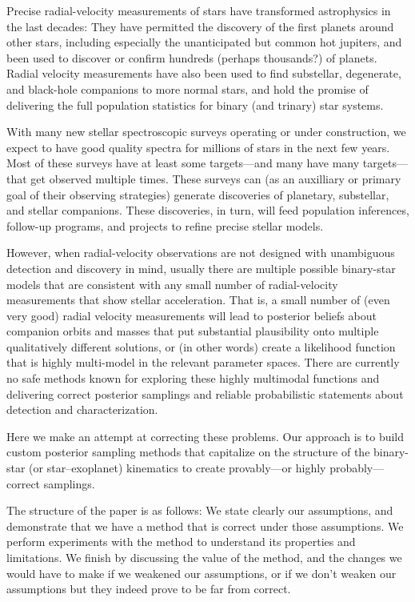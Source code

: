 \documentclass[12pt, preprint]{aastex}
\begin{document}
Precise radial-velocity measurements of stars have transformed
astrophysics in the last decades:
They have permitted the discovery of the first planets around other stars,
including especially the unanticipated but common hot jupiters,
and been used to discover or confirm hundreds
(perhaps thousands?) of planets.
Radial velocity measurements have also been used to find substellar,
degenerate, and black-hole companions to more normal stars, and hold
the promise of delivering the full population statistics for binary
(and trinary) star systems.

With many new stellar spectroscopic surveys operating or under
construction, we expect to have good quality spectra for millions
of stars in the next few years.
Most of these surveys have at least some targets---and many have many
targets---that get observed multiple times.
These surveys can (as an auxilliary or primary goal of their observing
strategies) generate discoveries of planetary, substellar, and stellar
companions.
These discoveries, in turn, will feed population inferences, follow-up
programs, and projects to refine precise stellar models.

However, when radial-velocity observations are not designed with
unambiguous detection and discovery in mind, usually there are
multiple possible binary-star models that are consistent with any
small number of radial-velocity measurements that show stellar
acceleration.
That is, a small number of (even very good) radial velocity
measurements will lead to posterior beliefs about companion orbits and
masses that put substantial plausibility onto multiple qualitatively
different solutions, or (in other words) create a likelihood function
that is highly multi-model in the relevant parameter spaces.
There are currently no safe methods known for exploring these highly
multimodal functions and delivering correct posterior samplings and
reliable probabilistic statements about detection and
characterization.

Here we make an attempt at correcting these problems.
Our approach is to build custom posterior sampling methods that
capitalize on the structure of the binary-star (or star--exoplanet)
kinematics to create provably---or highly probably---correct
samplings.

The structure of the paper is as follows:
We state clearly our assumptions, and demonstrate that we have a
method that is correct under those assumptions.
We perform experiments with the method to understand its properties
and limitations.
We finish by discussing the value of the method, and the changes we
would have to make if we weakened our assumptions, or if we don't
weaken our assumptions but they indeed prove to be far from correct.
\end{document}

